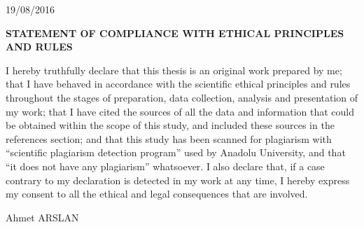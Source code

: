 %
%
%

\newpage
{}

\begin{flushright}
19/08/2016
\end{flushright}

\begin{center}
\textbf{STATEMENT OF COMPLIANCE WITH ETHICAL PRINCIPLES AND RULES}
\end{center}

I hereby truthfully declare that this thesis is an original work prepared by me; that I have behaved in accordance with the scientific ethical principles and rules throughout the stages of preparation, data collection, analysis and presentation of my work; that I have cited the sources of all the data and information that could be obtained within the scope of this study, and included these sources in the references section; and that this study has been scanned for plagiarism with ``scientific plagiarism detection program'' used by Anadolu University, and that ``it does not have any plagiarism'' whatsoever. I also declare that, if a case contrary to my declaration is detected in my work at any time, I hereby express my consent to all the ethical and legal consequences that are involved.


\vspace*{2.15cm}

\begin{flushright}
Ahmet ARSLAN
\end{flushright}